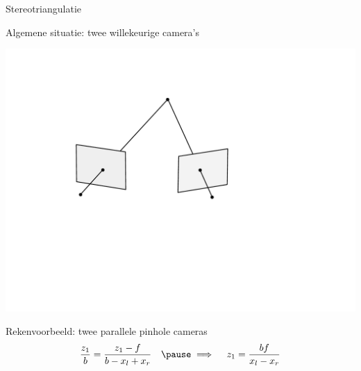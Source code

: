 \documentclass{beamer}
\begin{document}
\begin{frame}{Stereotriangulatie}

{\large Algemene situatie: twee willekeurige camera's}

\centerline{\includegraphics[scale=0.4, clip=true, viewport= 120 230 470 470]{triang}}
\vfill
\pause
{\large Rekenvoorbeeld: twee parallele pinhole cameras}
\pause
$$
\frac{z_1}{b} = \frac{z_1 - f}{b-x_l+x_r}\quad \pause\implies\quad z_1 = \frac {bf} {x_l - x_r}
$$
\end{frame}
\end{document}

